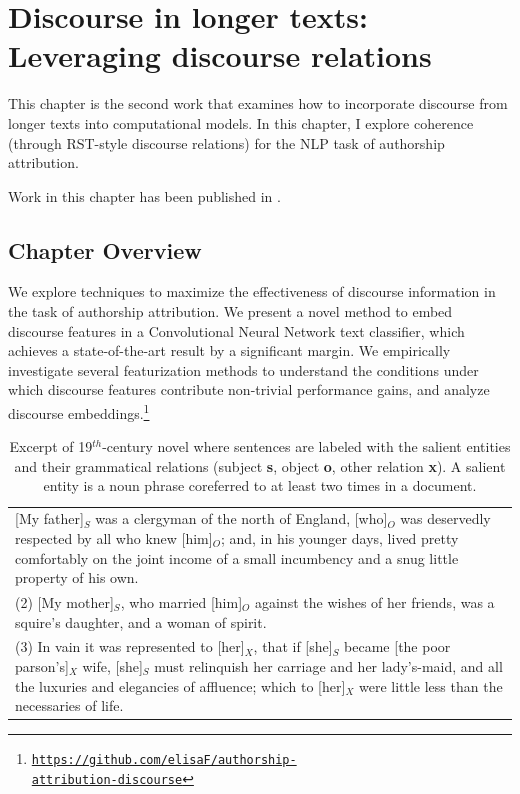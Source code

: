 \chapter{Discourse in longer texts: Leveraging discourse relations}
\label{ch:longertexts2}
This chapter is the second work that examines how to incorporate discourse from longer texts into computational models. In this chapter, I explore coherence (through RST-style discourse relations) for the NLP task of authorship attribution.

Work in this chapter has been published in .

\section{Chapter Overview}
We explore techniques to maximize the effectiveness of discourse information in the task of authorship attribution. 
We present a novel method to embed discourse features in a Convolutional Neural Network text classifier, which achieves a state-of-the-art result by a significant margin.
We empirically investigate several featurization methods to understand the conditions under which discourse features contribute non-trivial performance gains, and analyze discourse embeddings.\footnote{\href{http://github.com/elisaF/authorship-attribution-discourse}{\tt{https://github.com/elisaF/authorship-\\attribution-discourse}}}

\vspace{-.5em}
\begin{table}[t]
\centering
\begin{tabular}{p{10.5cm}}
\toprule(1) [My father]$_S$ was a clergyman of the north of England, [who]$_O$ was deservedly respected by all who knew [him]$_O$; and, in his younger days, lived pretty comfortably on the joint income of a small incumbency and a snug little property of his own. \\
(2) [My mother]$_S$, who married [him]$_O$ against the wishes of her friends, was a squire's daughter, and a woman of spirit. \\  
(3) In vain it was represented to [her]$_X$, that if [she]$_S$ became [the poor parson's]$_X$ wife, [she]$_S$ must relinquish her carriage and her lady's-maid, and all the luxuries and elegancies of affluence; which to [her]$_X$ were little less than the necessaries of life.\\\bottomrule
\end{tabular}
\vspace{-.8em}
\caption{\label{tab:sents} Excerpt of 19$^{th}$-century novel where sentences are labeled with the salient entities and their grammatical relations (subject \textbf{s}, object \textbf{o}, other relation \textbf{x}). A salient entity is a noun phrase coreferred to at least two times in a document.}
\end{table}

